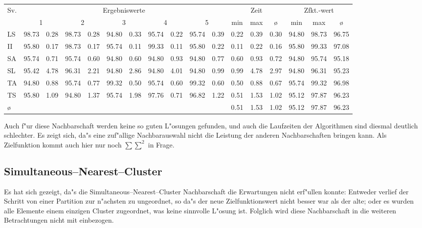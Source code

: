 {\footnotesize
\setlength\tabcolsep{0.75mm}
\begin{tabular}{l||rr|rr|rr|rr|rr||ccc||ccc}
Sv. & 
	\multicolumn{10}{c||}{{\normalsize Ergebniswerte} \rule[-1mm]{0mm}{5mm} } &
	\multicolumn{3}{c||}{{\normalsize Zeit}} & 
	\multicolumn{3}{c}{{\normalsize Zfkt.-wert}} \\ 
 & 
	\multicolumn{2}{c|}{1} &
	\multicolumn{2}{c|}{2} &
	\multicolumn{2}{c|}{3} &
	\multicolumn{2}{c|}{4} &
	\multicolumn{2}{c||}{5} &
	min & max & {\o} & min & max & {\o}\\
\hline
\hline
LS&98.73&0.28&98.73&0.28&94.80&0.33&95.74&0.22&95.74&0.39&0.22&0.39&0.30&94.80&98.73&96.75\\
II&95.80&0.17&98.73&0.17&95.74&0.11&99.33&0.11&95.80&0.22&0.11&0.22&0.16&95.80&99.33&97.08\\
SA&95.74&0.71&95.74&0.60&94.80&0.60&94.80&0.93&94.80&0.77&0.60&0.93&0.72&94.80&95.74&95.18\\
SL&95.42&4.78&96.31&2.21&94.80&2.86&94.80&4.01&94.80&0.99&0.99&4.78&2.97&94.80&96.31&95.23\\
TA&94.80&0.88&95.74&0.77&99.32&0.50&95.74&0.60&99.32&0.60&0.50&0.88&0.67&95.74&99.32&96.98\\
TS&95.80&1.09&94.80&1.37&95.74&1.98&97.76&0.71&96.82&1.22&0.51&1.53&1.02&95.12&97.87&96.23\\
\hline
\multicolumn{1}{l}{{\o}} & \multicolumn{10}{c}{\quad} & 0.51&1.53&\multicolumn{1}{c}{1.02} & 95.12&97.87&96.23
\end{tabular}
}

Auch f"ur diese Nachbarschaft werden keine so guten L"osungen gefunden, und
auch die Laufzeiten der Algorithmen sind diesmal deutlich schlechter.
Es zeigt sich, da"s eine zuf"allige Nachbarauswahl nicht die Leistung der
anderen Nachbarschaften bringen kann. Als Zielfunktion kommt auch hier
nur noch $\sum\sum^2$ in Frage.

\subsection*{Simultaneous--Nearest--Cluster}
Es hat sich gezeigt, da"s die Simultaneous--Nearest--Cluster Nachbarschaft 
die Erwartungen nicht erf"ullen konnte: Entweder verlief
der Schritt von einer Partition zur n"achsten zu ungeordnet, so da"s der
neue Zielfunktionswert nicht besser war als der alte; oder
es wurden alle Elemente einem einzigen Cluster zugeordnet, was keine
sinnvolle L"osung ist.
Folglich wird diese Nachbarschaft in die weiteren Betrachtungen
nicht mit einbezogen.

